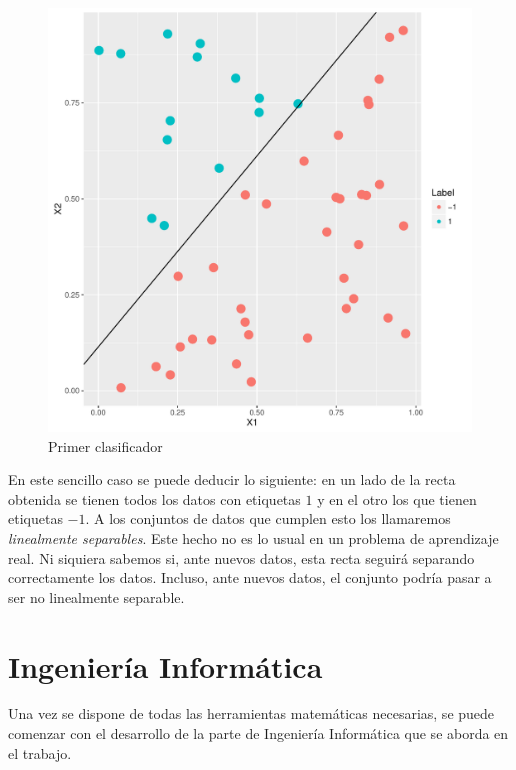 \documentclass[a4paper,11pt]{book}\usepackage[]{graphicx}\usepackage[]{color}
\makeatletter
\def\maxwidth{ %
  \ifdim\Gin@nat@width>\linewidth
    \linewidth
  \else
    \Gin@nat@width
  \fi
}
\newenvironment{knitrout}{}{} %
\makeatother
\begin{document}
\begin{knitrout}
\color{fgcolor}\begin{figure}
\includegraphics[width=\maxwidth]{figure/classificationExample-1} \caption[Primer clasificador]{Primer clasificador}\label{fig:classificationExample}
\end{figure}


\end{knitrout}

En este sencillo caso se puede deducir lo siguiente: en un lado de la recta obtenida
se tienen todos los datos con etiquetas $1$ y en el otro los que tienen etiquetas $-1$.
A los conjuntos de datos que cumplen esto los llamaremos \emph{linealmente separables}.
Este hecho no es lo usual en un problema de aprendizaje real. Ni siquiera sabemos
si, ante nuevos datos, esta recta seguirá separando correctamente los datos. Incluso,
ante nuevos datos, el conjunto podría pasar a ser no linealmente separable.

\newpage
\section{Ingeniería Informática}
Una vez se dispone de todas las herramientas matemáticas necesarias,
se puede comenzar con el desarrollo de la parte de Ingeniería Informática que
se aborda en el trabajo.
\end{document}
